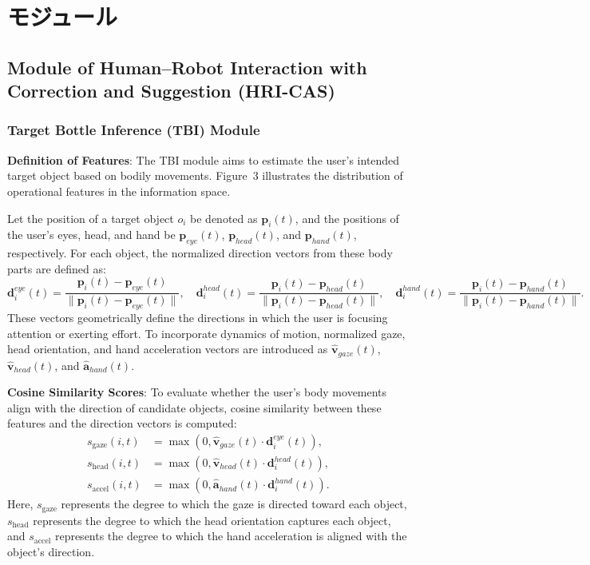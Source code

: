 \documentclass[../../main.tex]{subfiles} %
\begin{document}
\setcounter{page}{0} %

\chapter{モジュール}\label{chap:introduction}


\section{Module of Human–Robot Interaction with Correction and Suggestion (HRI-CAS)}
\subsection{Target Bottle Inference (TBI) Module}

\textbf{Definition of Features}:  
The TBI module aims to estimate the user’s intended target object based on bodily movements.  
Figure~3 illustrates the distribution of operational features in the information space.  

Let the position of a target object $o_i$ be denoted as $\mathbf{p}_i(t)$,  
and the positions of the user’s eyes, head, 
and hand be $\mathbf{p}_{eye}(t)$, $\mathbf{p}_{head}(t)$, and $\mathbf{p}_{hand}(t)$, respectively.  
For each object, the normalized direction vectors from these body parts are defined as:
\begin{equation}
\mathbf{d}_i^{eye}(t) = \frac{\mathbf{p}_i(t)-\mathbf{p}_{eye}(t)}{\|\mathbf{p}_i(t)-\mathbf{p}_{eye}(t)\|}, \quad
\mathbf{d}_i^{head}(t) = \frac{\mathbf{p}_i(t)-\mathbf{p}_{head}(t)}{\|\mathbf{p}_i(t)-\mathbf{p}_{head}(t)\|}, \quad
\mathbf{d}_i^{hand}(t) = \frac{\mathbf{p}_i(t)-\mathbf{p}_{hand}(t)}{\|\mathbf{p}_i(t)-\mathbf{p}_{hand}(t)\|}.
\end{equation}
These vectors geometrically define the directions in which the user is focusing attention or exerting effort.  
To incorporate dynamics of motion, normalized gaze, head orientation, and hand acceleration vectors are introduced as  
$\hat{\mathbf{v}}_{gaze}(t)$, $\hat{\mathbf{v}}_{head}(t)$, and $\hat{\mathbf{a}}_{hand}(t)$.

\medskip
\textbf{Cosine Similarity Scores}:  
To evaluate whether the user’s body movements align with the direction of candidate objects,  
cosine similarity between these features and the direction vectors is computed:
\begin{align}
s_{\text{gaze}}(i,t) &= \max \left(0, \hat{\mathbf{v}}_{gaze}(t)\cdot \mathbf{d}_i^{eye}(t)\right), \\
s_{\text{head}}(i,t) &= \max \left(0, \hat{\mathbf{v}}_{head}(t)\cdot \mathbf{d}_i^{head}(t)\right), \\
s_{\text{accel}}(i,t) &= \max \left(0, \hat{\mathbf{a}}_{hand}(t)\cdot \mathbf{d}_i^{hand}(t)\right).
\end{align}
Here, $s_{\text{gaze}}$ represents the degree to which the gaze is directed toward each object,  
$s_{\text{head}}$ represents the degree to which the head orientation captures each object,  
and $s_{\text{accel}}$ represents the degree to which the hand acceleration is aligned with the object’s direction.  
\end{document}
